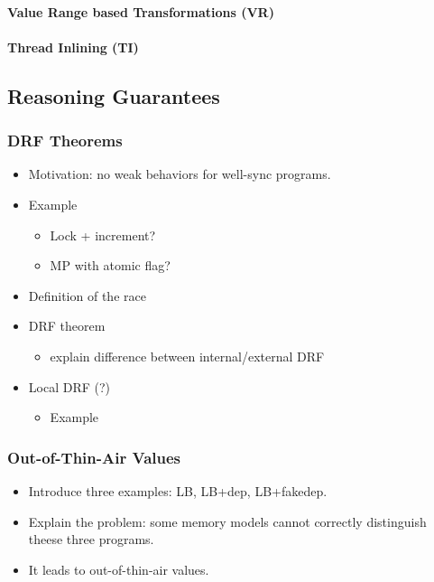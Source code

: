 \paragraph{Value Range based Transformations (VR)}

\paragraph{Thread Inlining (TI)}

\subsection{Reasoning Guarantees}

\subsubsection{DRF Theorems}
\label{sec:background-drf}

\begin{itemize}
  \item Motivation: no weak behaviors for well-sync programs.
  \item Example
  \begin{itemize}
    \item Lock + increment?
    \item MP with atomic flag?
  \end{itemize}
  \item Definition of the race
  \item DRF theorem
  \begin{itemize}
    \item explain difference between internal/external DRF
  \end{itemize}
  \item Local DRF (?)
  \begin{itemize}
    \item Example
  \end{itemize}
\end{itemize}

\subsubsection{Out-of-Thin-Air Values}
\label{sec:bgrnd-oota}

\begin{itemize}
  \item Introduce three examples: LB, LB+dep, LB+fakedep.
  \item Explain the problem: some memory models cannot 
    correctly distinguish theese three programs.
  \item It leads to out-of-thin-air values.
\end{itemize}

